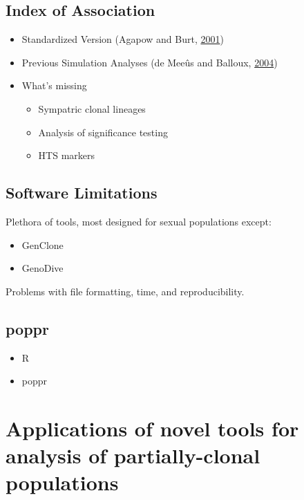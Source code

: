 \documentclass[double,12pt]{beavtex}
\providecommand{\tightlist}{%
  \setlength{\itemsep}{0pt}\setlength{\parskip}{0pt}}
\begin{document}
  \subsection{Index of Association}\label{index-of-association}
  
  \begin{itemize}
  \tightlist
  \item
    Standardized Version (Agapow and Burt,
    \protect\hyperlink{ref-Agapowux5f2001}{2001})
  \item
    Previous Simulation Analyses (de Meeûs and Balloux,
    \protect\hyperlink{ref-de2004clonal}{2004})
  \item
    What's missing
  
    \begin{itemize}
    \tightlist
    \item
      Sympatric clonal lineages
    \item
      Analysis of significance testing
    \item
      HTS markers
    \end{itemize}
  \end{itemize}
  
  \subsection{Software Limitations}\label{software-limitations}
  
  Plethora of tools, most designed for sexual populations except:
  
  \begin{itemize}
  \tightlist
  \item
    GenClone
  \item
    GenoDive
  \end{itemize}
  
  Problems with file formatting, time, and reproducibility.
  
  \subsection{poppr}\label{poppr}
  
  \begin{itemize}
  \tightlist
  \item
    R
  \item
    poppr
  \end{itemize}
  
  \section{Applications of novel tools for analysis of partially-clonal
  populations}\label{applications-of-novel-tools-for-analysis-of-partially-clonal-populations}
  
\end{document}
